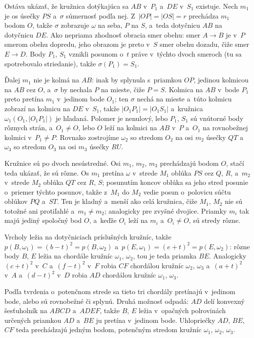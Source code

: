 {    Ostáva ukázať, že kružnica dotýkajúca sa $AB$ v~$P_1$ a~$DE$ v~$S_1$ existuje. Nech $m_1$ je os úsečky $PS$ a~$\sigma$ súmernosť podľa nej. Z~$|OP| = |OS| = r$ prechádza $m_1$ bodom $O$, takže $\sigma$ zobrazuje $\omega$ na seba, $P$ na $S$, a~teda dotyčnicu $AB$ na dotyčnicu $DE$. Ako nepriama zhodnosť obracia smer obehu: smer $A \to B$ je v~$P$ smerom obehu dopredu, jeho obrazom je preto v~$S$ smer obehu dozadu, čiže smer $E \to D$. Body $P_1$, $S_1$ vznikli posunom o~$t$ práve v~týchto dvoch smeroch (tu sa spotrebovalo striedanie), takže $\sigma(P_1) = S_1$.

    Ďalej $m_1$ nie je kolmá na $AB$: inak by splynula s~priamkou $OP$, jedinou kolmicou na $AB$ cez $O$, a~$\sigma$ by nechala $P$ na mieste, čiže $P = S$. Kolmica na $AB$ v~bode $P_1$ preto pretína $m_1$ v~jedinom bode $O_1$; ten $\sigma$ nechá na mieste a~túto kolmicu zobrazí na kolmicu na $DE$ v~$S_1$, takže $|O_1P_1| = |O_1S_1|$ a~kružnica $\omega_1(O_1,|O_1P_1|)$ je hľadaná. Polomer je nenulový, lebo $P_1$, $S_1$ sú vnútorné body rôznych strán, a~$O_1 \neq O$, lebo $O$ leží na kolmici na $AB$ v~$P$ a~$O_1$ na rovnobežnej kolmici v~$P_1 \neq P$. Rovnako zostrojíme $\omega_2$ so stredom $O_2$ na osi $m_2$ úsečky $QT$ a~$\omega_3$ so stredom $O_3$ na osi $m_3$ úsečky $RU$.

    Kružnice sú po dvoch nesústredné. Osi $m_1$, $m_2$, $m_3$ prechádzajú bodom $O$, stačí teda ukázať, že sú rôzne. Os $m_1$ pretína $\omega$ v~strede $M_1$ oblúka $PS$ cez $Q$, $R$, a~$m_2$ v~strede $M_2$ oblúka $QT$ cez $R$, $S$; posunutím koncov oblúka sa jeho stred posunie o~priemer týchto posunov, takže z~$M_1$ do $M_2$ vedie posun o~polovicu súčtu oblúkov $PQ$ a~$ST$. Ten je kladný a~menší ako celá kružnica, čiže $M_1$, $M_2$ nie sú totožné ani protiľahlé a~$m_1 \neq m_2$; analogicky pre zvyšné dvojice. Priamky $m_i$ tak majú jediný spoločný bod $O$, a~keďže $O_i$ leží na $m_i$ a~$O_i \neq O$, sú stredy rôzne.

    Vrcholy ležia na dotyčniciach príslušných kružníc, takže $p(B,\omega_1) = (b-t)^2 = p(B,\omega_2)$ a~$p(E,\omega_1) = (e+t)^2 = p(E,\omega_2)$: rôzne body $B$, $E$ ležia na chordále kružníc $\omega_1$, $\omega_2$, tou je teda priamka $BE$. Analogicky $(c+t)^2$ v~$C$ a~$(f-t)^2$ v~$F$ robia $CF$ chordálou kružníc $\omega_2$, $\omega_3$ a~$(a+t)^2$ v~$A$ a~$(d-t)^2$ v~$D$ robia $AD$ chordálou kružníc $\omega_1$, $\omega_3$.

    Podľa tvrdenia o~potenčnom strede sa tieto tri chordály pretínajú v~jedinom bode, alebo sú rovnobežné či splynú. Druhá možnosť odpadá: $AD$ delí konvexný šesťuholník na $ABCD$ a~$ADEF$, takže $B$, $E$ ležia v~opačných polrovinách určených priamkou $AD$ a~$BE$ ju pretína v~jedinom bode. Uhlopriečky $AD$, $BE$, $CF$ teda prechádzajú jedným bodom, potenčným stredom kružníc $\omega_1$, $\omega_2$, $\omega_3$.
}

